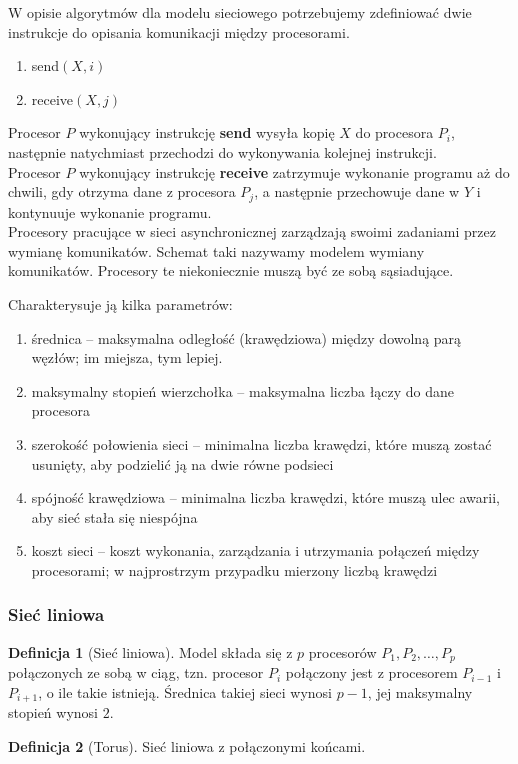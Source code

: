\documentclass[a4paper,oneside,leqno,12pt]{book}
\theoremstyle{definition}
\newtheorem{definicja}{Definicja}[chapter]
\theoremstyle{plain}
\theoremstyle{remark}
\begin{document}
W opisie algorytmów dla modelu sieciowego potrzebujemy zdefiniować dwie instrukcje do opisania komunikacji między procesorami.
\begin{enumerate}
 \item send\((X,i)\)
 \item receive\((X,j)\)
\end{enumerate}

Procesor \(P\) wykonujący instrukcję \textbf{send} wysyła kopię \(X\) do procesora \(P_i\), następnie natychmiast przechodzi do wykonywania kolejnej instrukcji.\\
Procesor \(P\) wykonujący instrukcję \textbf{receive} zatrzymuje wykonanie programu aż do chwili, gdy otrzyma dane z procesora \(P_j\), a następnie przechowuje dane w \(Y\) i kontynuuje wykonanie programu.\\



Procesory pracujące w sieci asynchronicznej zarządzają swoimi zadaniami przez wymianę komunikatów. Schemat taki nazywamy modelem wymiany komunikatów. Procesory te niekoniecznie muszą być ze sobą sąsiadujące. 


Charakterysuje ją kilka parametrów:

\begin{enumerate}
 \item średnica – maksymalna odległość (krawędziowa) między dowolną parą węzłów; im miejsza, tym lepiej.
 \item maksymalny stopień wierzchołka – maksymalna liczba łączy do dane procesora
 \item szerokość połowienia sieci – minimalna liczba krawędzi, które muszą zostać usunięty, aby podzielić ją na dwie równe podsieci
 \item spójność krawędziowa – minimalna liczba krawędzi, które muszą ulec awarii, aby sieć stała się niespójna
 \item koszt sieci – koszt wykonania, zarządzania i utrzymania połączeń między procesorami; w najprostrzym przypadku mierzony liczbą krawędzi
\end{enumerate}


\subsubsection{Sieć liniowa}
\begin{definicja}[Sieć liniowa]
Model składa się z \(p\) procesorów \(P_1, P_2, \dots, P_p\) połączonych ze sobą w ciąg, tzn. procesor \(P_i\) połączony jest z procesorem \(P_{i-1}\) i \(P_{i+1}\), o ile takie istnieją. Średnica takiej sieci wynosi \(p-1\), jej maksymalny stopień wynosi \(2\).\\
\end{definicja}
\begin{definicja}[Torus]
Sieć liniowa z połączonymi końcami.
\end{definicja}
\end{document}
